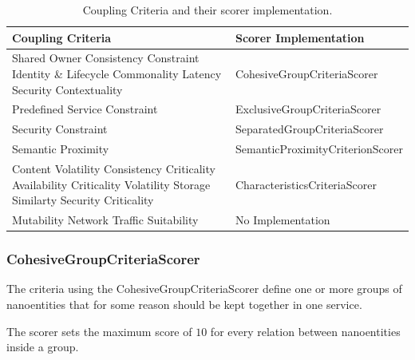 \begin{table}[H]
	\centering
	\caption{Coupling Criteria and their scorer implementation.}
	\label{tab:scorer}
	\begin{tabular}{|p{170pt}|p{200pt}|}
		\hline	
		\textbf{Coupling Criteria} & \textbf{Scorer Implementation}  \\
		\hline
		Shared Owner \newline Consistency Constraint \newline Identity \& Lifecycle Commonality \newline Latency \newline Security Contextuality & CohesiveGroupCriteriaScorer \\
		\hline
		Predefined Service Constraint  & ExclusiveGroupCriteriaScorer \\ 
		\hline
		Security Constraint & SeparatedGroupCriteriaScorer \\
		\hline
		Semantic Proximity & SemanticProximityCriterionScorer \\
		\hline
		Content Volatility \newline Consistency Criticality \newline Availability Criticality \newline Volatility \newline Storage Similarty \newline Security Criticality & CharacteristicsCriteriaScorer  \\
		\hline
		Mutability \newline Network Traffic Suitability  & No Implementation  \\
		\hline
	\end{tabular}
\end{table}



\subsubsection{CohesiveGroupCriteriaScorer}

The criteria using the CohesiveGroupCriteriaScorer define one or more groups of nanoentities that for some reason should be kept together in one service.

The scorer sets the maximum score of $10$ for every relation between nanoentities inside a group. 

